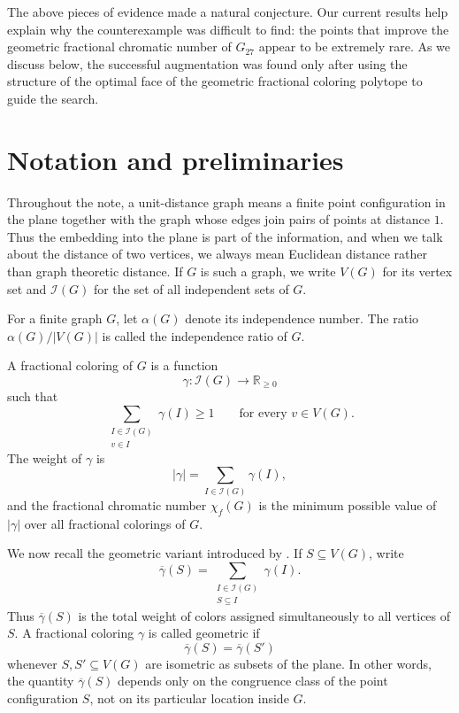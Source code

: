 \documentclass[pdflatex,sn-mathphys-num]{sn-jnl}%
\begin{document}
The above pieces of evidence made \cite[Conjecture 1]{MRVZ} a natural conjecture. Our current results help explain why the counterexample was difficult to find: the points that improve the geometric fractional chromatic number of $G_{27}$ appear to be extremely rare. As we discuss below, the successful augmentation was found only after using the structure of the optimal face of the geometric fractional coloring polytope to guide the search.


\section{Notation and preliminaries}

Throughout the note, a unit-distance graph means a finite point configuration in the plane together with the graph whose edges join pairs of points at distance $1$. Thus the embedding into the plane is part of the information, and when we talk about the distance of two vertices, we always mean Euclidean distance rather than graph theoretic distance. If $G$ is such a graph, we write $V(G)$ for its vertex set and $\mathcal I(G)$ for the set of all independent sets of $G$.

For a finite graph $G$, let $\alpha(G)$ denote its independence number. The ratio
$\alpha(G)/|V(G)|$ is called the independence ratio of $G$.

A fractional coloring of $G$ is a function
\[
    \gamma:\mathcal I(G)\to \mathbb R_{\ge 0}
\]
such that
\[
    \sum_{\substack{I\in\mathcal I(G)\\ v\in I}} \gamma(I) \ge 1
    \qquad \text{for every } v\in V(G).
\]
The weight of $\gamma$ is
\[
    |\gamma|=\sum_{I\in\mathcal I(G)} \gamma(I),
\]
and the fractional chromatic number $\chi_f(G)$ is the minimum possible value
of $|\gamma|$ over all fractional colorings of $G$.

We now recall the geometric variant introduced by \cite{ACMVZ}. If
$S\subseteq V(G)$, write
\[
    \overline\gamma(S)
    =
    \sum_{\substack{I\in\mathcal I(G)\\ S\subseteq I}} \gamma(I).
\]
Thus $\overline\gamma(S)$ is the total weight of colors assigned simultaneously to all
vertices of $S$. A fractional coloring $\gamma$ is called geometric if
\[
    \overline\gamma(S)=\overline\gamma(S')
\]
whenever $S,S'\subseteq V(G)$ are isometric as subsets of the plane. In other
words, the quantity $\overline\gamma(S)$ depends only on the congruence class of the
point configuration $S$, not on its particular location inside $G$.
\end{document}
